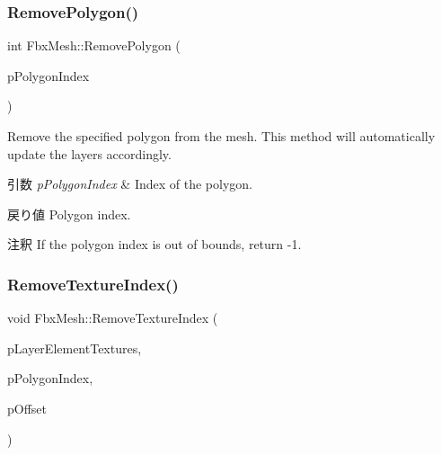 \subsubsection{\texorpdfstring{Remove\+Polygon()}{RemovePolygon()}}
{\footnotesize\ttfamily int Fbx\+Mesh\+::\+Remove\+Polygon (\begin{DoxyParamCaption}\item[{int}]{p\+Polygon\+Index }\end{DoxyParamCaption})}

Remove the specified polygon from the mesh. This method will automatically update the layers accordingly. 
\begin{DoxyParams}{引数}
{\em p\+Polygon\+Index} & Index of the polygon. \\
\hline
\end{DoxyParams}
\begin{DoxyReturn}{戻り値}
Polygon index. 
\end{DoxyReturn}
\begin{DoxyRemark}{注釈}
If the polygon index is out of bounds, return -\/1. 
\end{DoxyRemark}
\mbox{\label{class_fbx_mesh_a7ae53a8f960212268fbfa5d5a63333ee}} 
\subsubsection{\texorpdfstring{Remove\+Texture\+Index()}{RemoveTextureIndex()}}
{\footnotesize\ttfamily void Fbx\+Mesh\+::\+Remove\+Texture\+Index (\begin{DoxyParamCaption}\item[{\hyperlink{class_fbx_layer_element_texture}{Fbx\+Layer\+Element\+Texture} $\ast$}]{p\+Layer\+Element\+Textures,  }\item[{int}]{p\+Polygon\+Index,  }\item[{int}]{p\+Offset }\end{DoxyParamCaption})\hspace{0.3cm}{\ttfamily [protected]}}

\mbox{\label{class_fbx_mesh_addc0a339c2d452b4a1d8d6a465aa9c62}} 
